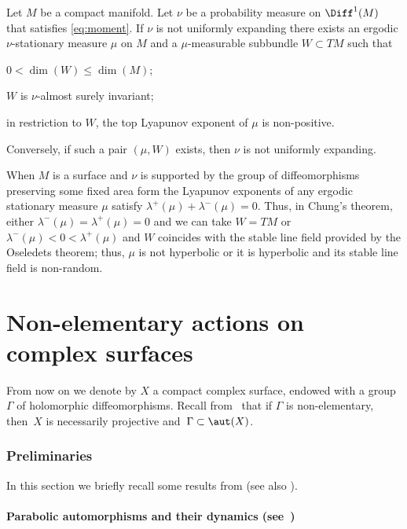 \begin{thm}[Chung] \label{thm:criterion_chung}
Let $M$ be a compact manifold. Let $\nu$ be a probability measure on $\Diff^1(M)$
that satisfies \eqref{eq:moment}. If $\nu$ is not uniformly expanding there exists an ergodic $\nu$-stationary measure $\mu$ on $M$ and a $\mu$-measurable
subbundle $W\subset TM$ such that
\begin{enumeratea}
\item\label{thm:criterion_chunga} $0<\dim(W)\leq \dim(M)$;
\item\label{thm:criterion_chungb} $W$ is $\nu$-almost surely invariant;
\item\label{thm:criterion_chungc} in restriction to $W$, the top Lyapunov exponent of $\mu$ is non-positive.
\end{enumeratea}
Conversely, if such a pair $(\mu, W)$ exists, then $\nu$ is not uniformly expanding.
\end{thm}

When $M$ is a surface and $\nu$ is supported by the group of diffeomorphisms preserving some fixed area form
the Lyapunov exponents of any ergodic stationary measure $\mu$ satisfy $\lambda^+(\mu)+\lambda^{-}(\mu)=0$. Thus,
in Chung's theorem, either $\lambda^{-}(\mu)=\lambda^{+}(\mu)=0$ and we can take $W=TM$ or $\lambda^{-}(\mu)<0<\lambda^+(\mu)$ and $W$ coincides with the stable line field
provided by the
Oseledets theorem; thus, $\mu$ is not hyperbolic or it is hyperbolic and its stable line field is non-random.\vspace*{-.5\baselineskip}

\part{Non-elementary actions on complex surfaces}

From now on we denote by $X$ a compact complex surface, endowed with a
group~$\Gamma$ of holomorphic
diffeomorphisms. Recall from~\cite{stiffness, Simons} that if $\Gamma$ is non-elementary, then~$X$ is necessarily projective and~$\Gamma\subset \aut(X)$.

\section{Preliminaries}\label{sec:preliminaries}

In this section we briefly recall some results from \cite{invariant} (see also \cite{cantat_groupes, Cantat:Milnor}).

\subsection{Parabolic automorphisms and their dynamics (see~\cite[\S 3]{invariant})} \label{subs:halphen}

